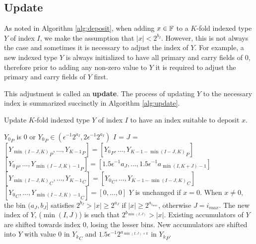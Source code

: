 \subsection{Update}
    \label{sec:primitiveops_update}
    As noted in Algorithm \ref{alg:deposit}, when adding $x \in \mathbb{F}$ to a $K$-fold
    indexed type $Y$ of index $I$, we make the assumption that $|x| < 2^{b_I}$.
    However, this is not always the case and sometimes it is necessary to adjust the index of $Y$.
    For example, a new indexed type $Y$ is always initialized to have all primary
    and carry fields of 0, therefore prior to adding any non-zero value to $Y$
    it is required to adjust the primary and carry fields of $Y$ first.

    This adjustment is called an \textbf{update}.    
    The process of updating $Y$ to the necessary index is summarized succinctly
    in Algorithm \ref{alg:update}.

    \begin{samepage}
    \begin{alg}
      Update $K$-fold indexed type $Y$ of index $I$ to have an index suitable to deposit $x$.
      \begin{algorithmic}[1]
        \Require
          \Statex ${Y_0}_P$ is 0 or ${Y_0}_P \in (\epsilon^{-1}  2^{a_{I}}, 2  \epsilon^{-1}  2^{a_I})$
            \State \Return
          \EndIf
          \State $I$ = 
          \State $J$ = 
            \State $[{Y_{\min(I - J, K)}}_P, ..., {Y_{K - 1}}_P] = [{Y_0}_P, ..., {Y_{K - 1 - \min(I - J, K)}}_P]$
            \State $[{Y_0}_P, ..., {Y_{\min(I - J, K) - 1}}_P] = [1.5  \epsilon^{-1}  a_{J}, ..., 1.5  \epsilon^{-1}  a_{\min(I, K + J) - 1}]$
            \State $[{Y_{\min(I - J, K)}}_C, ..., {Y_{K - 1}}_C] = [{Y_0}_C, ..., {Y_{K - 1 - \min(I - J, K)}}_C]$
            \State $[{Y_0}_C, ..., {Y_{\min(I - J, K) - 1}}_C] = [0, ..., 0]$
          \EndIf
        \EndFunction
        \Ensure
          \Statex $Y$ is unchanged if $x = 0$.
            When $x \neq 0$, the bin $(a_{J}, b_{J}]$ satisfies
            $2^{b_{J}} > |x| \geq 2^{a_{J}}$ if $|x| \geq 2^{a_{i_{max}}}$,
            otherwise $J = i_{max}$.
          \Statex The new index of $Y$, ($\min(I, J)$) is such that $2^{b_{\min(I, J)}} > |x|$.
          \Statex Existing accumulators of $Y$ are shifted towards index $0$, losing the lesser bins.
          \Statex New accumulators are shifted into $Y$ with value $0$ in ${Y_k}_C$ and $1.5  \epsilon^{-1}  2^{a_{\min(I, J) + k}}$ in ${Y_k}_P$.
      \end{algorithmic}
      \label{alg:update}
    \end{alg}
    \end{samepage}

